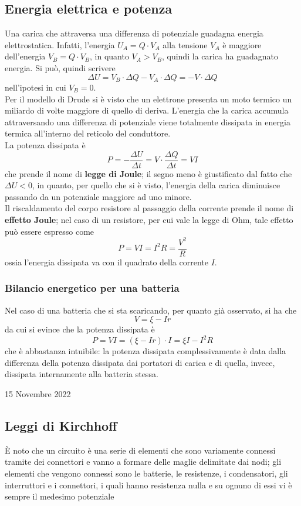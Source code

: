 \documentclass[a4paper]{extarticle}
\begin{document}
\subsection{Energia elettrica e potenza}
Una carica che attraversa una differenza di potenziale guadagna energia elettrostatica. Infatti, l'energia $U_A=Q \cdot V_A$ alla tensione $V_A$ è maggiore dell'energia $V_B=Q \cdot V_B$, in quanto $V_A > V_B$, quindi la carica ha guadagnato energia. Si può, quindi scrivere
\[\Delta U = V_B \cdot \Delta Q - V_A \cdot \Delta Q = - V \cdot \Delta Q\]
nell'ipotesi in cui $V_B=0$.\\
Per il modello di Drude si è visto che un elettrone presenta un moto termico un miliardo di volte maggiore di quello di deriva. L'energia che la carica accumula attraversando una differenza di potenziale viene totalmente dissipata in energia termica all'interno del reticolo del conduttore.\\
La potenza dissipata è
\[\boxed{P=- \dfrac{\Delta U}{\Delta t} = V \cdot \dfrac{\Delta Q}{\Delta t} = VI}\]
che prende il nome di \textbf{legge di Joule}; il segno meno è giustificato dal fatto che $\Delta U<0$, in quanto, per quello che si è visto, l'energia della carica diminuisce passando da un potenziale maggiore ad uno minore.\\
Il riscaldamento del corpo resistore al passaggio della corrente prende il nome di \textbf{effetto Joule}; nel caso di un resistore, per cui vale la legge di Ohm, tale effetto può essere espresso come
\[\boxed{P=VI=I^2R=\dfrac{V^2}{R}}\]
ossia l'energia dissipata va con il quadrato della corrente $I$.

\vspace{1em}
\subsubsection{Bilancio energetico per una batteria}
Nel caso di una batteria che si sta scaricando, per quanto già osservato, si ha che
\[V=\xi - I r\]
da cui si evince che la potenza dissipata è
\[P=VI=(\xi - I r) \cdot I = \xi I - I^2 R\]
che è abbastanza intuibile: la potenza dissipata complessivamente è data dalla differenza della potenza dissipata dai portatori di carica e di quella, invece, dissipata internamente alla batteria stessa.

\newpage
\noindent
\begin{center}
  15 Novembre 2022
\end{center}
\subsection{Leggi di Kirchhoff}
È noto che un circuito è una serie di elementi che sono variamente connessi tramite dei connettori e vanno a formare delle maglie delimitate dai nodi; gli elementi che vengono connessi sono le batterie, le resistenze, i condensatori, gli interruttori e i connettori, i quali hanno resistenza nulla e su ognuno di essi vi è sempre il medesimo potenziale
\end{document}
